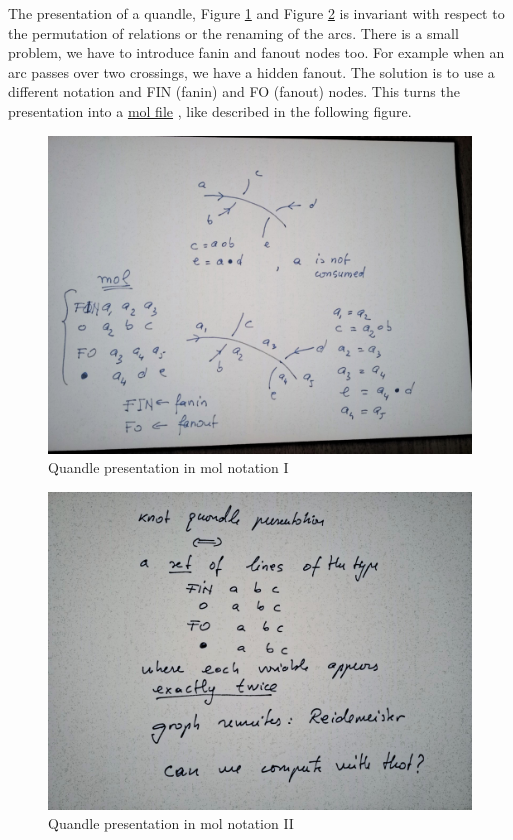 \documentclass[]{article}
\begin{document}
The presentation of a quandle, Figure \ref{Quandle-presentation-in-mol-notation-I} and Figure \ref{Quandle-presentation-in-mol-notation-II} is invariant with respect to the
permutation of relations or the renaming of the arcs. There is a small
problem, we have to introduce fanin and fanout nodes too. For example
when an arc passes over two crossings, we have a hidden fanout. The
solution is to use a different notation and FIN (fanin) and FO (fanout)
nodes. This turns the presentation into a
\href{https://arxiv.org/abs/2003.14332}{mol file} \cite{buligageneral}, like described in the
following figure.

\begin{figure}[h!]
\centering
\includegraphics[width=0.75\linewidth]{img/3439.jpg}
\caption{Quandle presentation in mol notation I}
\label{Quandle-presentation-in-mol-notation-I}
\end{figure}

\begin{figure}[h!]
\centering
\includegraphics[width=0.75\linewidth]{img/3450.jpg}
\caption{Quandle presentation in mol notation II}
\label{Quandle-presentation-in-mol-notation-II}
\end{figure}
\end{document}
